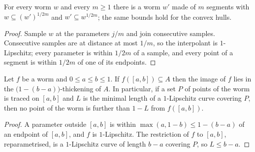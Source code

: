 \begin{theorem}
    \label{thm:polygonalApprox}
    \leanok
    For every worm $w$ and every $m \ge 1$ there is a worm $w'$ made of $m$
    segments with $w \subseteq (w')^{1/2m}$ and $w' \subseteq w^{1/2m}$; the same
    bounds hold for the convex hulls.
\end{theorem}
\begin{proof}
    \leanok
    Sample $w$ at the parameters $j/m$ and join consecutive samples. Consecutive
    samples are at distance at most $1/m$, so the interpolant is $1$-Lipschitz;
    every parameter is within $1/2m$ of a sample, and every point of a segment
    is within $1/2m$ of one of its endpoints.
\end{proof}

\begin{theorem}
    \label{thm:pruning}
    \leanok
    Let $f$ be a worm and $0 \le a \le b \le 1$. If $f([a,b]) \subseteq A$ then
    the image of $f$ lies in the $\big(1 - (b-a)\big)$-thickening of $A$. In
    particular, if a set $P$ of points of the worm is traced on $[a,b]$ and $L$
    is the minimal length of a $1$-Lipschitz curve covering $P$, then no point of
    the worm is further than $1 - L$ from $f([a,b])$.
\end{theorem}
\begin{proof}
    \leanok
    A parameter outside $[a,b]$ is within $\max(a, 1-b) \le 1 - (b-a)$ of an
    endpoint of $[a,b]$, and $f$ is $1$-Lipschitz. The restriction of $f$ to
    $[a,b]$, reparametrised, is a $1$-Lipschitz curve of length $b - a$ covering
    $P$, so $L \le b - a$.
\end{proof}

